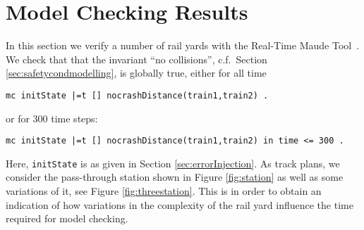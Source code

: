 \section{Model Checking Results}
\label{sec:modelchecking}

In this section we verify a number of rail yards with the Real-Time
Maude Tool~\cite{olveczky2008real}. We check that that the invariant
``no collisions'', c.f.\ Section \ref{sec:safetycondmodelling}, is
globally true, either for all time 
\begin{lstlisting}[columns=fixed]
mc initState |=t [] nocrashDistance(train1,train2) . 
\end{lstlisting}
or for 300 time steps:
\begin{lstlisting}[columns=fixed]
mc initState |=t [] nocrashDistance(train1,train2) in time <= 300 . 
\end{lstlisting}

Here, \verb|initState| is as given in Section
\ref{sec:errorInjection}. As track plans, we consider the pass-through
station shown in Figure \ref{fig:station} as well as some variations
of it, see Figure \ref{fig:threestation}. This is in order to obtain
an indication of how variations in the complexity of the rail yard
influence the time required for model checking.

